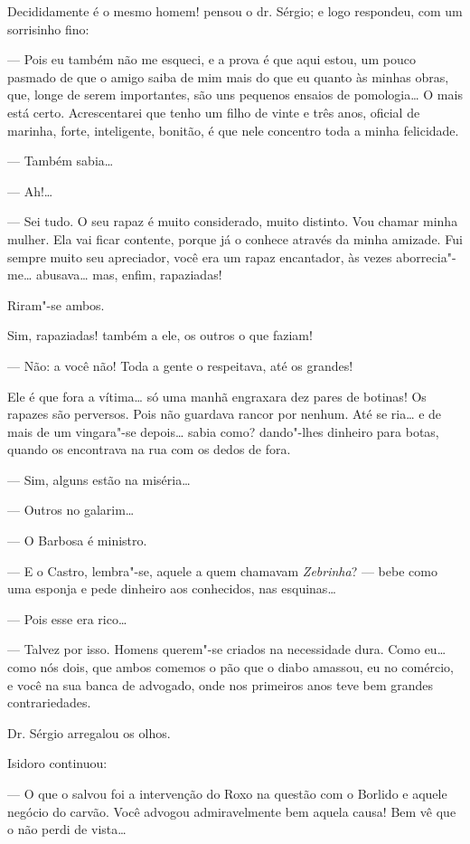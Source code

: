Decididamente é o mesmo homem! pensou o dr. Sérgio; e logo respondeu,
com um sorrisinho fino:

--- Pois eu também não me esqueci, e a prova é que aqui estou, um pouco
pasmado de que o amigo saiba de mim mais do que eu quanto às minhas
obras, que, longe de serem importantes, são uns pequenos ensaios de
pomologia\ldots{} O mais está certo. Acrescentarei que tenho um filho de
vinte e três anos, oficial de marinha, forte, inteligente, bonitão, é
que nele concentro toda a minha felicidade.

--- Também sabia\ldots{}

--- Ah!\ldots{}

--- Sei tudo. O seu rapaz é muito considerado, muito distinto. Vou
chamar minha mulher. Ela vai ficar contente, porque já o conhece através
da minha amizade. Fui sempre muito seu apreciador, você era um rapaz
encantador, às vezes aborrecia"-me\ldots{} abusava\ldots{} mas, enfim, rapaziadas!

Riram"-se ambos.

Sim, rapaziadas! também a ele, os outros o que faziam!

--- Não: a você não! Toda a gente o respeitava, até os grandes!

Ele é que fora a vítima\ldots{} só uma manhã engraxara dez pares de botinas!
Os rapazes são perversos. Pois não guardava rancor por nenhum. Até se
ria\ldots{} e de mais de um vingara"-se depois\ldots{} sabia como? dando"-lhes
dinheiro para botas, quando os encontrava na rua com os dedos de fora.

--- Sim, alguns estão na miséria\ldots{}

--- Outros no galarim\ldots{}

--- O Barbosa é ministro.

--- E o Castro, lembra"-se, aquele a quem chamavam \emph{Zebrinha}? ---
bebe como uma esponja e pede dinheiro aos conhecidos, nas esquinas\ldots{}

--- Pois esse era rico\ldots{}

--- Talvez por isso. Homens querem"-se criados na necessidade dura. Como
eu\ldots{} como nós dois, que ambos comemos o pão que o diabo amassou, eu no
comércio, e você na sua banca de advogado, onde nos primeiros anos teve
bem grandes contrariedades.

Dr. Sérgio arregalou os olhos.

Isidoro continuou:

--- O que o salvou foi a intervenção do Roxo na questão com o Borlido e
aquele negócio do carvão. Você advogou admiravelmente bem aquela causa!
Bem vê que o não perdi de vista\ldots{}

